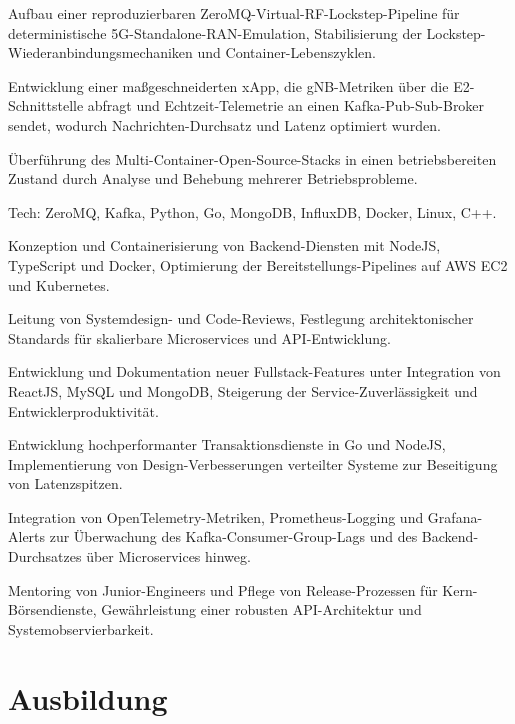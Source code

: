 \documentclass[10pt,a4paper]{resume}
\begin{document}
\bullets
  \item Aufbau einer reproduzierbaren ZeroMQ-Virtual-RF-Lockstep-Pipeline für deterministische 5G-Standalone-RAN-Emulation, Stabilisierung der Lockstep-Wiederanbindungsmechaniken und Container-Lebenszyklen.
  \item Entwicklung einer maßgeschneiderten xApp, die gNB-Metriken über die E2-Schnittstelle abfragt und Echtzeit-Telemetrie an einen Kafka-Pub-Sub-Broker sendet, wodurch Nachrichten-Durchsatz und Latenz optimiert wurden.
  \item Überführung des Multi-Container-Open-Source-Stacks in einen betriebsbereiten Zustand durch Analyse und Behebung mehrerer Betriebsprobleme.
  \item Tech: ZeroMQ, Kafka, Python, Go, MongoDB, InfluxDB, Docker, Linux, C++.
\bulletsend
\vspace{1.5pt}
\bullets
  \item Konzeption und Containerisierung von Backend-Diensten mit NodeJS, TypeScript und Docker, Optimierung der Bereitstellungs-Pipelines auf AWS EC2 und Kubernetes.
  \item Leitung von Systemdesign- und Code-Reviews, Festlegung architektonischer Standards für skalierbare Microservices und API-Entwicklung.
  \item Entwicklung und Dokumentation neuer Fullstack-Features unter Integration von ReactJS, MySQL und MongoDB, Steigerung der Service-Zuverlässigkeit und Entwicklerproduktivität.
\bulletsend
\vspace{1.5pt}
\bullets
  \item Entwicklung hochperformanter Transaktionsdienste in Go und NodeJS, Implementierung von Design-Verbesserungen verteilter Systeme zur Beseitigung von Latenzspitzen.
  \item Integration von OpenTelemetry-Metriken, Prometheus-Logging und Grafana-Alerts zur Überwachung des Kafka-Consumer-Group-Lags und des Backend-Durchsatzes über Microservices hinweg.
  \item Mentoring von Junior-Engineers und Pflege von Release-Prozessen für Kern-Börsendienste, Gewährleistung einer robusten API-Architektur und Systemobservierbarkeit.
\bulletsend
\vspace{1.5pt}

\section{Ausbildung}
\end{document}

